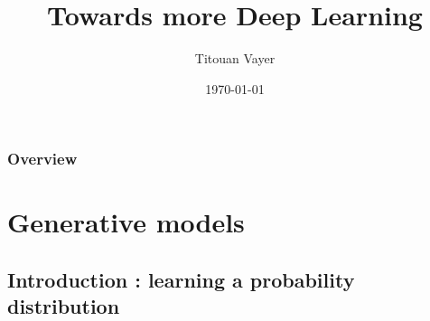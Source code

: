 \documentclass[french,9pt]{beamer}
\title[GAN's]{Towards more Deep Learning} %
\author{Titouan Vayer} %
\date{\today} %
\begin{document}

\begin{frame}
\titlepage %
\end{frame}

\begin{frame}
\frametitle{Overview} %
  \tableofcontents
\end{frame}






\section{Generative models}

\subsection{Introduction : learning a probability distribution}
\end{document}
